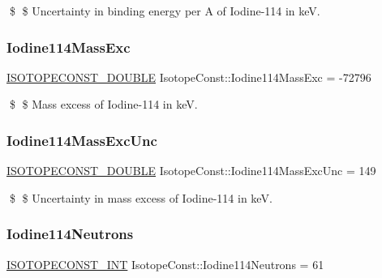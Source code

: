 \$ \$ Uncertainty in binding energy per A of Iodine-\/114 in keV. \mbox{\label{group___isotope_const-_iodine-_i114_ga66917a240e63e69fc0582cb14f201907}} 
\subsubsection{\texorpdfstring{Iodine114\+Mass\+Exc}{Iodine114MassExc}}
{\footnotesize\ttfamily \mbox{\hyperlink{group___isotope_const-_macros_ga8f45a7272ce02c0b4c65c44636ed719a}{I\+S\+O\+T\+O\+P\+E\+C\+O\+N\+S\+T\+\_\+\+D\+O\+U\+B\+LE}} Isotope\+Const\+::\+Iodine114\+Mass\+Exc = -\/72796}

\$ \$ Mass excess of Iodine-\/114 in keV. \mbox{\label{group___isotope_const-_iodine-_i114_ga2ffc95c11fa87824a199503f12bfdd1a}} 
\subsubsection{\texorpdfstring{Iodine114\+Mass\+Exc\+Unc}{Iodine114MassExcUnc}}
{\footnotesize\ttfamily \mbox{\hyperlink{group___isotope_const-_macros_ga8f45a7272ce02c0b4c65c44636ed719a}{I\+S\+O\+T\+O\+P\+E\+C\+O\+N\+S\+T\+\_\+\+D\+O\+U\+B\+LE}} Isotope\+Const\+::\+Iodine114\+Mass\+Exc\+Unc = 149}

\$ \$ Uncertainty in mass excess of Iodine-\/114 in keV. \mbox{\label{group___isotope_const-_iodine-_i114_gac032b7192ddf20cad55b1927be87d3f7}} 
\subsubsection{\texorpdfstring{Iodine114\+Neutrons}{Iodine114Neutrons}}
{\footnotesize\ttfamily \mbox{\hyperlink{group___isotope_const-_macros_ga5f18360b3e99483a35c32d789e62621c}{I\+S\+O\+T\+O\+P\+E\+C\+O\+N\+S\+T\+\_\+\+I\+NT}} Isotope\+Const\+::\+Iodine114\+Neutrons = 61}

